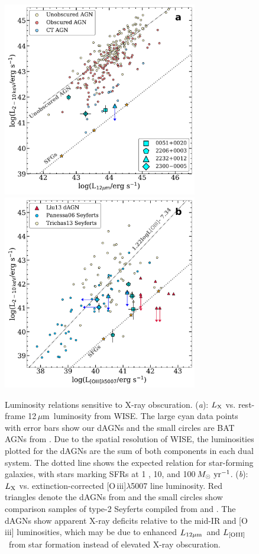 \documentclass[iop,revtex4,twocolumn,apj,numberedappendix,appendixfloats]{emulateapj}
\newcommand{\msunyr}{$M_{\odot}~{\rm yr}^{-1}$}
\newcommand{\um}{$\mu$m}
\newcommand{\lmir}{$L_{\rm 12\mu m}$}
\newcommand{\loiii}{$L_{\rm [OIII]}$}
\begin{document}
\begin{figure}
\includegraphics[width=8.5cm]{figs/Lx-Lir_rest.pdf}
\includegraphics[width=8.5cm]{figs/Lx-L[OIII]unabs.pdf}
\caption{Luminosity relations sensitive to X-ray obscuration. 
%
({\it a}): $L_{\rm X}$ vs. rest-frame 12\,\um\ luminosity from WISE. The large cyan data points with error bars show our dAGNs and the small circles are BAT AGNs from \citet{Ricci15}. Due to the spatial resolution of WISE, the luminosities plotted for the dAGNs are the sum of both components in each dual system. The dotted line shows the expected relation for star-forming galaxies, with stars marking SFRs at 1 , 10, and 100\,\msunyr. 
%
({\it b}): $L_{\rm X}$ vs. extinction-corrected [O\,{\sc iii}]$\lambda$5007 line luminosity. Red triangles denote the dAGNs from \citet{Liu13} and the small circles show comparison samples of type-2 Seyferts compiled from \citet{Panessa06} and \citet{Trichas13}. 
%
The dAGNs show apparent X-ray deficits relative to the mid-IR and [O\,{\sc iii}] luminosities, which may be due to enhanced \lmir\ and \loiii\ from star formation instead of elevated X-ray obscuration.
}
\label{fig:LxLir}
\end{figure}
\end{document}
